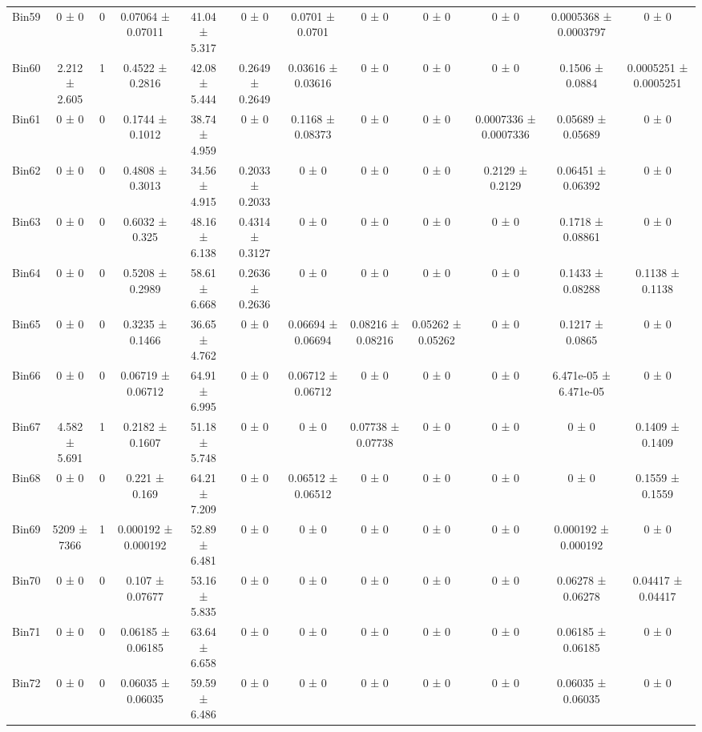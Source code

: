 \begin{tabular}{@{\extracolsep{4pt}}lccccccccccc@{}}
     Bin59 & 0 ± 0 & 0 & 0.07064 ± 0.07011 & 41.04 ± 5.317 & 0 ± 0 & 0.0701 ± 0.0701 & 0 ± 0 & 0 ± 0 & 0 ± 0 & 0.0005368 ± 0.0003797 & 0 ± 0 \\ 
     Bin60 & 2.212 ± 2.605 & 1 & 0.4522 ± 0.2816 & 42.08 ± 5.444 & 0.2649 ± 0.2649 & 0.03616 ± 0.03616 & 0 ± 0 & 0 ± 0 & 0 ± 0 & 0.1506 ± 0.0884 & 0.0005251 ± 0.0005251 \\ 
     Bin61 & 0 ± 0 & 0 & 0.1744 ± 0.1012 & 38.74 ± 4.959 & 0 ± 0 & 0.1168 ± 0.08373 & 0 ± 0 & 0 ± 0 & 0.0007336 ± 0.0007336 & 0.05689 ± 0.05689 & 0 ± 0 \\ 
     Bin62 & 0 ± 0 & 0 & 0.4808 ± 0.3013 & 34.56 ± 4.915 & 0.2033 ± 0.2033 & 0 ± 0 & 0 ± 0 & 0 ± 0 & 0.2129 ± 0.2129 & 0.06451 ± 0.06392 & 0 ± 0 \\ 
     Bin63 & 0 ± 0 & 0 & 0.6032 ± 0.325 & 48.16 ± 6.138 & 0.4314 ± 0.3127 & 0 ± 0 & 0 ± 0 & 0 ± 0 & 0 ± 0 & 0.1718 ± 0.08861 & 0 ± 0 \\ 
     Bin64 & 0 ± 0 & 0 & 0.5208 ± 0.2989 & 58.61 ± 6.668 & 0.2636 ± 0.2636 & 0 ± 0 & 0 ± 0 & 0 ± 0 & 0 ± 0 & 0.1433 ± 0.08288 & 0.1138 ± 0.1138 \\ 
     Bin65 & 0 ± 0 & 0 & 0.3235 ± 0.1466 & 36.65 ± 4.762 & 0 ± 0 & 0.06694 ± 0.06694 & 0.08216 ± 0.08216 & 0.05262 ± 0.05262 & 0 ± 0 & 0.1217 ± 0.0865 & 0 ± 0 \\ 
     Bin66 & 0 ± 0 & 0 & 0.06719 ± 0.06712 & 64.91 ± 6.995 & 0 ± 0 & 0.06712 ± 0.06712 & 0 ± 0 & 0 ± 0 & 0 ± 0 & 6.471e-05 ± 6.471e-05 & 0 ± 0 \\ 
     Bin67 & 4.582 ± 5.691 & 1 & 0.2182 ± 0.1607 & 51.18 ± 5.748 & 0 ± 0 & 0 ± 0 & 0.07738 ± 0.07738 & 0 ± 0 & 0 ± 0 & 0 ± 0 & 0.1409 ± 0.1409 \\ 
     Bin68 & 0 ± 0 & 0 & 0.221 ± 0.169 & 64.21 ± 7.209 & 0 ± 0 & 0.06512 ± 0.06512 & 0 ± 0 & 0 ± 0 & 0 ± 0 & 0 ± 0 & 0.1559 ± 0.1559 \\ 
     Bin69 & 5209 ± 7366 & 1 & 0.000192 ± 0.000192 & 52.89 ± 6.481 & 0 ± 0 & 0 ± 0 & 0 ± 0 & 0 ± 0 & 0 ± 0 & 0.000192 ± 0.000192 & 0 ± 0 \\ 
     Bin70 & 0 ± 0 & 0 & 0.107 ± 0.07677 & 53.16 ± 5.835 & 0 ± 0 & 0 ± 0 & 0 ± 0 & 0 ± 0 & 0 ± 0 & 0.06278 ± 0.06278 & 0.04417 ± 0.04417 \\ 
     Bin71 & 0 ± 0 & 0 & 0.06185 ± 0.06185 & 63.64 ± 6.658 & 0 ± 0 & 0 ± 0 & 0 ± 0 & 0 ± 0 & 0 ± 0 & 0.06185 ± 0.06185 & 0 ± 0 \\ 
     Bin72 & 0 ± 0 & 0 & 0.06035 ± 0.06035 & 59.59 ± 6.486 & 0 ± 0 & 0 ± 0 & 0 ± 0 & 0 ± 0 & 0 ± 0 & 0.06035 ± 0.06035 & 0 ± 0 \\ 

\end{tabular}
